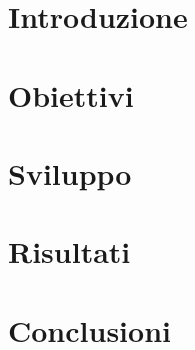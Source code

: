 \documentclass[12pt]{article}
\begin{document}
\maketitle

\section{Introduzione}

\section{Obiettivi}

\section{Sviluppo}

\section{Risultati}

\section{Conclusioni}
\end{document}
